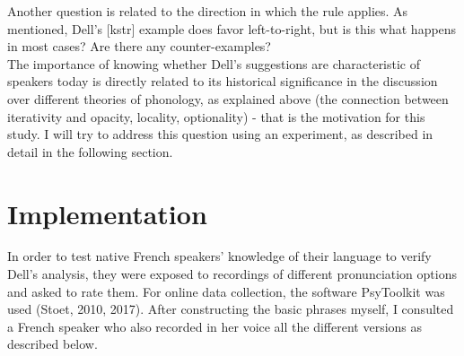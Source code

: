 \documentclass{article}
\begin{document}
Another question is related to the direction in which the rule applies. As mentioned,  Dell's [kstr] example does favor left-to-right, but is this what happens in most cases? Are there any counter-examples?\\

The importance of knowing whether Dell's suggestions are characteristic of speakers today is directly related to its historical significance in the discussion over different theories of phonology,  as explained above (the connection between iterativity and opacity, locality, optionality) - that is the motivation for this study. I will try to address this question using an experiment, as described in detail in the following section.


\clearpage
\section{Implementation} 
In order to test native French speakers' knowledge of their language to verify Dell's analysis, they were exposed to recordings of different pronunciation options and asked to rate them.  For online data collection,  the software PsyToolkit was used (Stoet, 2010, 2017). After constructing the basic phrases myself, I consulted a French speaker who also recorded in her voice all the different versions as described below. 


\end{document}
